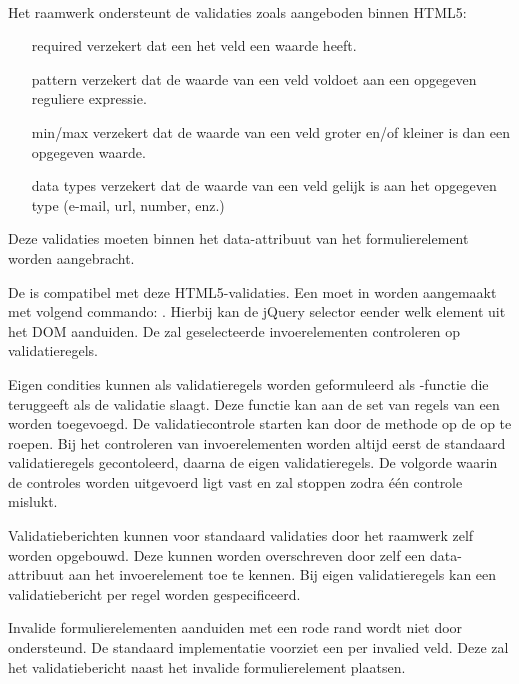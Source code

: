 \paragraph{\kendo}
Het \kendo{} raamwerk ondersteunt de validaties zoals aangeboden binnen HTML5:
\begin{itemize}
  \item [required] verzekert dat een het veld een waarde heeft.
  \item [pattern] verzekert dat de waarde van een veld voldoet aan een opgegeven reguliere expressie.
  \item [min/max] verzekert dat de waarde van een veld groter en/of kleiner is dan een opgegeven waarde.
  \item [data types] verzekert dat de waarde van een veld gelijk is aan het opgegeven type (e-mail, url, number, enz.)
\end{itemize}
Deze validaties moeten binnen het data-attribuut van het formulierelement worden aangebracht.

De \kendo{}  is compatibel met deze HTML5-validaties.
Een  moet in \js worden aangemaakt met volgend commando:  .
Hierbij kan de jQuery selector eender welk element uit het DOM aanduiden.
De  zal geselecteerde invoerelementen controleren op validatieregels.

Eigen condities kunnen als validatieregels worden geformuleerd als \js-functie die  teruggeeft als de validatie slaagt.
Deze functie kan aan de set van regels van een  worden toegevoegd.
De validatiecontrole starten kan door de  methode op de  op te roepen.
Bij het controleren van invoerelementen worden altijd eerst de standaard validatieregels gecontoleerd,  daarna de eigen validatieregels.
De volgorde waarin de controles worden uitgevoerd ligt vast en zal stoppen zodra één controle mislukt.


Validatieberichten kunnen voor standaard validaties door het raamwerk zelf worden opgebouwd.
Deze kunnen worden overschreven door zelf een data-attribuut  aan het invoerelement toe te kennen.
Bij eigen validatieregels kan een validatiebericht per regel worden gespecificeerd.

Invalide formulierelementen aanduiden met een rode rand wordt niet door \kendo{} ondersteund.
De standaard implementatie voorziet een  per invalied veld.
Deze zal het validatiebericht naast het invalide formulierelement plaatsen. 

